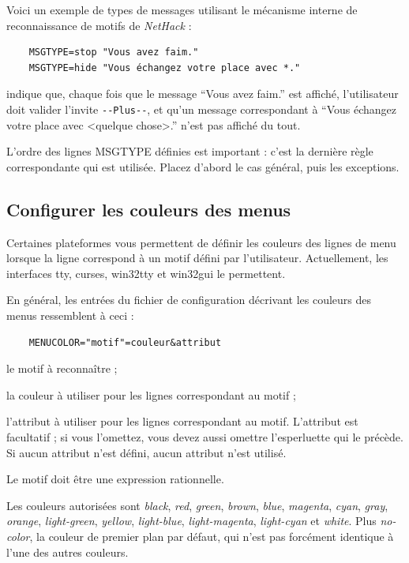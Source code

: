 \documentclass[titlepage]{article}
\begin{document}
Voici un exemple de types de messages utilisant le mécanisme interne de
reconnaissance de motifs de \textit{NetHack} :

\begin{verbatim}
    MSGTYPE=stop "Vous avez faim."
    MSGTYPE=hide "Vous échangez votre place avec *."
\end{verbatim}

indique que, chaque fois que le message ``Vous avez faim.'' est affiché,
l'utilisateur doit valider l'invite \texttt{-{}-Plus-{}-}, et qu'un message correspondant à
``Vous échangez votre place avec <quelque chose>.'' n'est pas affiché du tout.

L'ordre des lignes MSGTYPE définies est important : c'est la dernière règle
correspondante qui est utilisée. Placez d'abord le cas général, puis les exceptions.


\subsection*{Configurer les couleurs des menus}

Certaines plateformes vous permettent de définir les couleurs des lignes de menu
lorsque la ligne correspond à un motif défini par l'utilisateur.
Actuellement, les interfaces tty, curses, win32tty et
win32gui le permettent.

En général, les entrées du fichier de configuration décrivant les couleurs des
menus ressemblent à ceci :
\begin{verbatim}
    MENUCOLOR="motif"=couleur&attribut
\end{verbatim}

\begin{description}[font=\mdseries\itshape]
\item[motif]
le motif à reconnaître ;
\item[couleur]
la couleur à utiliser pour les lignes correspondant au motif ;
\item[attribut]
l'attribut à utiliser pour les lignes correspondant au motif. L'attribut est
facultatif ; si vous l'omettez, vous devez aussi omettre l'esperluette qui le précède.
Si aucun attribut n'est défini, aucun attribut n'est utilisé.
\end{description}

Le motif doit être une expression rationnelle.

Les couleurs autorisées sont \textit{black}, \textit{red}, \textit{green}, \textit{brown},
\textit{blue}, \textit{magenta}, \textit{cyan}, \textit{gray}, \textit{orange},
\textit{light-green}, \textit{yellow}, \textit{light-blue}, \textit{light-magenta},
\textit{light-cyan} et \textit{white}.
Plus \textit{no-color}, la couleur de premier plan par défaut, qui n'est pas
forcément identique à l'une des autres couleurs.
\end{document}
